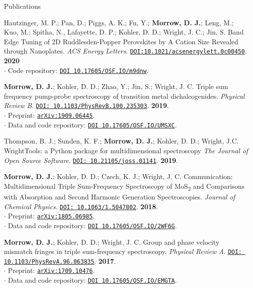 \documentclass{resume} %
\begin{document}
\begin{rSection}{Publications}
\begin{etaremune}
\item Hautzinger, M. P.; Pan, D.; Piggs, A. K.; Fu, Y.; \textbf{Morrow, D. J.}; Leng, M.; Kuo, M.; Spitha, N., Lafayette, D. P.; Kohler, D. D.; Wright, J. C.; Jin, S. Band Edge Tuning of 2D Ruddlesden-Popper Perovskites by A Cation Size Revealed through Nanoplates. \emph{ACS Energy Letters}. \href{https://pubs.acs.org/doi/10.1021/acsenergylett.0c00450}{\texttt{DOI:10.1021/acsenergylett.0c00450}}. \textbf{2020} \\
$\cdot$ Code repository: \href{https://osf.io/m9dnw/}{\texttt{DOI 10.17605/OSF.IO/m9dnw}}.

\item  \textbf{Morrow, D. J.}; Kohler, D. D.; Zhao, Y.; Jin, S.; Wright, J. C. Triple sum frequency pump-probe spectroscopy of transition metal dichalcogenides. \emph{Physical Review B}. \href{https://journals.aps.org/pra/abstract/10.1103/PhysRevB.100.235303}{\texttt{DOI: 10.1103/PhysRevB.100.235303}}. \textbf{2019}.\\
$\cdot$ Preprint: \href{http://arxiv.org/abs/1909.06445}{\texttt{arXiv:1909.06445}}. \\
$\cdot$ Data and code repository: \href{https://osf.io/UMSXC/}{\texttt{DOI 10.17605/OSF.IO/UMSXC}}.

\item Thompson, B. J.; Sunden, K. F.; \textbf{Morrow, D. J.}; Kohler, D. D.; Wright, J.C. 
WrightTools: a Python package for multidimensional spectroscopy \emph{The Journal of Open Source Software}. 
\href{http://doi.org/10.21105/joss.01141}{\texttt{DOI: 10.21105/joss.01141}}. \textbf{2019}.
	
\item \textbf{Morrow, D. J.}; Kohler, D. D.; Czech, K. J.; Wright, J. C. 
Communication: Multidimensional Triple Sum-Frequency Spectroscopy of MoS\textsubscript{2} and Comparisons with Absorption and Second Harmonic Generation Spectroscopies. \emph{Journal of Chemical Physics}. \href{http://doi.org/10.1063/1.5047802}{\texttt{DOI: 10.1063/1.5047802}}. \textbf{2018}.\\
$\cdot$ Preprint: \href{http://arxiv.org/abs/1805.06985}{\texttt{arXiv:1805.06985}}. \\
$\cdot$ Data and code repository: \href{https://osf.io/2wf6g/}{\texttt{DOI 10.17605/OSF.IO/2WF6G}}.
	
\item \textbf{Morrow, D. J.}; Kohler, D. D.; Wright, J. C. Group and phase velocity mismatch fringes in triple sum-frequency spectroscopy. \emph{Physical Review A}. \href{https://journals.aps.org/pra/abstract/10.1103/PhysRevA.96.063835}{\texttt{DOI: 10.1103/PhysRevA.96.063835}}. \textbf{2017}.\\
$\cdot$ Preprint: \href{http://arxiv.org/abs/1709.10476}{\texttt{arXiv:1709.10476}}. \\
$\cdot$ Data and code repository: \href{https://osf.io/emgta/}{\texttt{DOI 10.17605/OSF.IO/EMGTA}}.


\end{etaremune}
\end{rSection}
\end{document}
